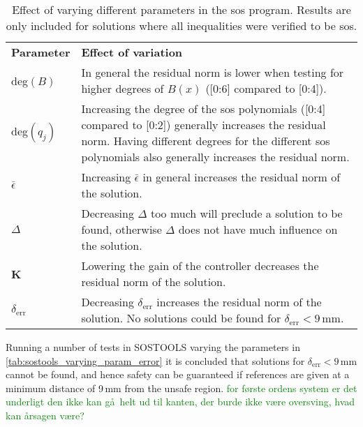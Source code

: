\begin{table}[htbp]
\begin{tabularx}{\textwidth}{l X}
\rowcolor{HeaderBlue}
\textbf{Parameter} & \textbf{Effect of variation}\\
deg$(B)$ & In general the residual norm is lower when testing for higher degrees of $B(x)$ ([0:6] compared to [0:4]).\\
\rowcolor{textBlue}
deg$(q_j)$ & Increasing the degree of the \gls{sos} polynomials ([0:4] compared to [0:2]) generally increases the residual norm. Having different degrees for the different \gls{sos} polynomials also generally increases the residual norm.\\
$\bar{\epsilon}$ & Increasing $\bar{\epsilon}$ in general increases the residual norm of the solution. \\
\rowcolor{textBlue}
$\Delta$ & Decreasing $\Delta$ too much will preclude a solution to be found, otherwise $\Delta$ does not have much influence on the solution.\\
\textbf{K} & Lowering the gain of the controller decreases the residual norm of the solution.\\
\rowcolor{textBlue}
$\delta_\text{err}$ & Decreasing $\delta_\text{err}$ increases the residual norm of the solution. No solutions could be found for $\delta_\text{err}<9$\,mm.
\end{tabularx}
\caption{Effect of varying different parameters in the \gls{sos} program. Results are only included for solutions where all inequalities were verified to be \gls{sos}.}
\label{tab:sostools_varying_param_error}
\end{table}



Running a number of tests in SOSTOOLS varying the parameters in \autoref{tab:sostools_varying_param_error} it is concluded that solutions for $\delta_\text{err}<9$\,mm cannot be found, and hence safety can be guaranteed if references are given at a minimum distance of 9\,mm from the unsafe region. \textcolor{green}{for f\o rste ordens system er det underligt den ikke kan g\aa\, helt ud til kanten, der burde ikke v\ae re oversving, hvad kan \aa rsagen v\ae re?}

